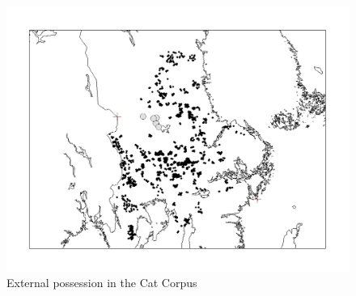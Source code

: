  

\begin{figure}[h]

\includegraphics{figures_mod/image20}
\caption{External possession in the Cat Corpus}
\label{map:20}

\end{figure}

